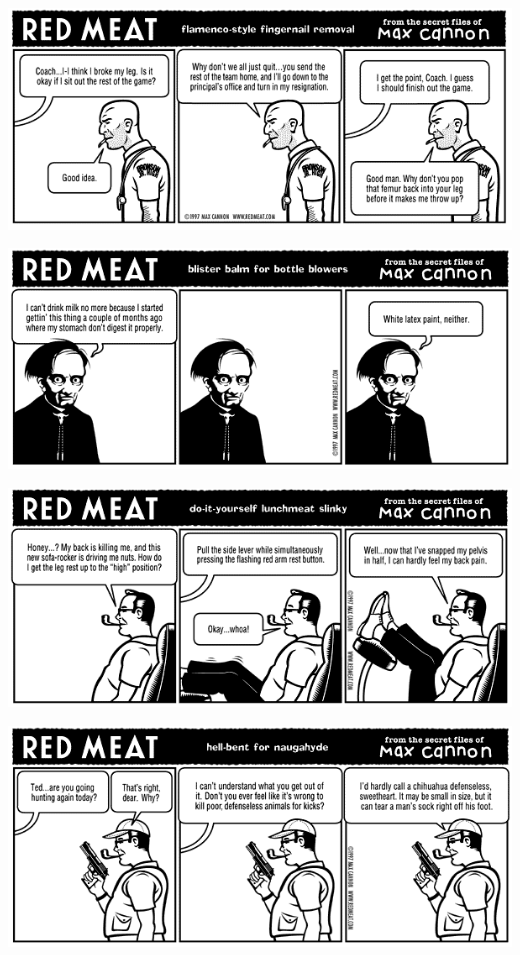\documentclass[a4paper,twoside,11pt]{article}
\begin{document}
\includegraphics[width=\textwidth]{redmeat_1997-12-22.png}



\includegraphics[width=\textwidth]{redmeat_1997-12-29.png}



\includegraphics[width=\textwidth]{redmeat_1998-01-05.png}



\includegraphics[width=\textwidth]{redmeat_1998-01-12.png}
\end{document}
